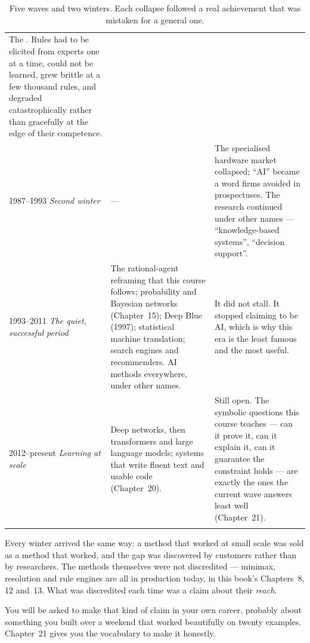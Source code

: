 \begin{longtable}{@{}L{2.5cm}L{5.4cm}L{7.1cm}@{}}
The . Rules had to be elicited from experts
one at a time, could not be learned, grew brittle at a few thousand rules, and
degraded catastrophically rather than gracefully at the edge of their competence.
\\
1987--1993 \newline \emph{Second winter} &
--- &
The specialised hardware market collapsed; ``AI'' became a word firms avoided in
prospectuses. The research continued under other names --- ``knowledge-based
systems'', ``decision support''. \\
1993--2011 \newline \emph{The quiet, successful period} &
The rational-agent reframing that this course follows; probability and Bayesian
networks (Chapter~15); Deep Blue (1997); statistical machine translation; search
engines and recommenders. AI methods everywhere, under other names. &
It did not stall. It stopped claiming to be AI, which is why this era is the least
famous and the most useful. \\
2012--present \newline \emph{Learning at scale} &
Deep networks, then transformers and large language models; systems that write
fluent text and usable code (Chapter~20). &
Still open. The symbolic questions this course teaches --- can it prove it, can it
explain it, can it guarantee the constraint holds --- are exactly the ones the
current wave answers least well (Chapter~21). \\
\bottomrule
\caption{Five waves and two winters. Each collapse followed a real achievement
that was mistaken for a general one.}\label{tab:ai-history}
\end{longtable}

\begin{alertbox}
Every winter arrived the same way: a method that worked at small scale was sold as
a method that worked, and the gap was discovered by customers rather than by
researchers. The methods themselves were not discredited --- minimax, resolution
and rule engines are all in production today, in this book's Chapters~8, 12
and~13. What was discredited each time was a claim about their \emph{reach}.

You will be asked to make that kind of claim in your own career, probably about
something you built over a weekend that worked beautifully on twenty examples.
Chapter~21 gives you the vocabulary to make it honestly.
\end{alertbox}

